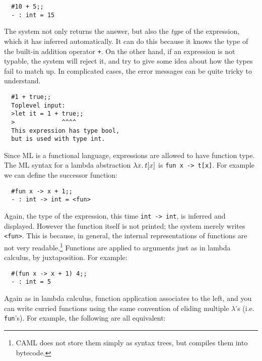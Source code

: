 \begin{boxed}\begin{verbatim}
  #10 + 5;;
  - : int = 15
\end{verbatim}\end{boxed}

The system not only returns the answer, but also the {\em type} of the
expression, which it has inferred automatically. It can do this because it
knows the type of the built-in addition operator {\tt +}. On the other hand, if
an expression is not typable, the system will reject it, and try to give some
idea about how the types fail to match up. In complicated cases, the error
messages can be quite tricky to understand.

\begin{boxed}\begin{verbatim}
  #1 + true;;
  Toplevel input:
  >let it = 1 + true;;
  >             ^^^^
  This expression has type bool,
  but is used with type int.
\end{verbatim}\end{boxed}

Since ML is a functional language, expressions are allowed to have function
type. The ML syntax for a lambda abstraction $\lambda x.\: t[x]$ is {\tt fun x ->
t[x]}. For example we can define the successor function:

\begin{boxed}\begin{verbatim}
  #fun x -> x + 1;;
  - : int -> int = <fun>
\end{verbatim}\end{boxed}

Again, the type of the expression, this time {\tt int -> int}, is inferred and
displayed. However the function itself is not printed; the system merely writes
{\tt <fun>}. This is because, in general, the internal representations of
functions are not very readable.\footnote{CAML does not store them simply as
syntax trees, but compiles them into bytecode.} Functions are applied to
arguments just as in lambda calculus, by juxtaposition. For example:

\begin{boxed}\begin{verbatim}
  #(fun x -> x + 1) 4;;
  - : int = 5
\end{verbatim}\end{boxed}

Again as in lambda calculus, function application associates to the left, and
you can write curried functions using the same convention of eliding multiple
$\lambda$'s (i.e. {\tt fun}'s). For example, the following are all equivalent:

